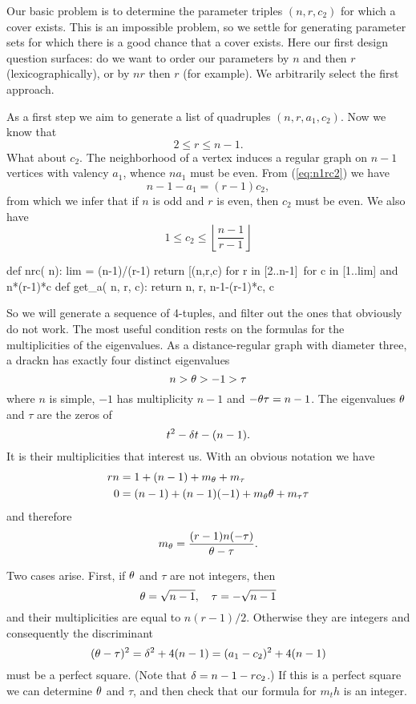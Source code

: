 Our basic problem is to determine the parameter triples $(n,r,c_2)$
for which a cover exists. This is an impossible problem, so we settle
for generating parameter sets for which there is a good chance that a
cover exists. Here our first design question surfaces: do we want to order
our parameters by $n$ and then $r$ (lexicographically), or by $nr$ then $r$
(for example). We arbitrarily select the first approach.

As a first step we aim to generate a list of quadruples $(n,r,a_1,c_2)$.
Now we know that
\begin{equation}
\label{eq:rbnd}
    2\le r\le n-1.
\end{equation}
What about $c_2$. The neighborhood of a vertex induces a regular graph
on $n-1$ vertices with valency $a_1$, whence $na_1$ must be even.
From (\ref{eq:n1rc2}) we have 
\[
    n-1-a_1 = (r-1)c_2,
\]
from which we infer that if $n$ is odd and $r$ is even, then $c_2$ must be
even. We also have
\begin{equation}
\label{c2bnd}
    1\le c_2 \le \left\lfloor\frac{n-1}{r-1}\right\rfloor
\end{equation}

\begin{sageblock}
    def nrc( n):
        lim = (n-1)/(r-1)
        return [(n,r,c) for r in [2..n-1]\ 
         for c in [1..lim] and n*(r-1)*c %
    def get_a( n, r, c):
        return n, r, n-1-(r-1)*c, c
\end{sageblock}

So we will generate a sequence of 4-tuples, and filter out the ones
that obviously do not work. The most useful condition rests on the formulas
for the multiplicities of the eigenvalues. As a distance-regular graph
with diameter three, a drackn has exactly four distinct eigenvalues
\[
    n > \theta > -1 > \tau
\]
where $n$ is simple, $-1$ has multiplicity $n-1$ and $-\theta\tau=n-1$.
The eigenvalues $\theta$ and $\tau$ are the zeros of
\[
    t^2 -\delta t - (n-1).
\]
It is their multiplicities that interest us. With an obvious notation we have
\begin{align*}
    rn &= 1 + (n-1) +m_\theta+m_\tau\\
    0  &= (n-1) +(n-1)(-1) +m_\theta\theta+m_\tau\tau
\end{align*}
and therefore
\begin{equation}
\label{eq:mult}
    m_\theta = \frac{(r-1)n(-\tau)}{\theta -\tau}.
\end{equation}

Two cases arise. First, if $\theta$ and $\tau$ are not integers, then
\[
    \theta=\sqrt{n-1},\quad \tau=-\sqrt{n-1}
\]
and their multiplicities are equal to $n(r-1)/2$. Otherwise they are integers
and consequently the discriminant
\begin{equation}
\label{eq:discr}
    (\theta-\tau)^2 = \delta^2+4(n-1) = (a_1-c_2)^2+4(n-1)
\end{equation}
must be a perfect square. (Note that $\delta=n-1-rc_2$.) If this is a perfect square
we can determine $\theta$ and $\tau$, and then check that our formula for $m_th$
is an integer.

